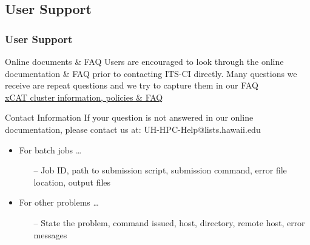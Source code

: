 \subsection{User Support}
\begin{frame}
  \frametitle{User Support}

  \begin{block}{Online documents \& FAQ}
    Users are encouraged to look through the online documentation \& FAQ prior to contacting ITS-CI directly.  Many questions we receive are repeat questions and we try to capture them in our FAQ~\\
    \href{https://www.hawaii.edu/its/ci/xcat/}{xCAT cluster information, policies \& FAQ}
  \end{block}
  \begin{block}{Contact Information}
    If your question is not answered in our online documentation, please contact us at: UH-HPC-Help@lists.hawaii.edu
    
    \begin{itemize}
    \item For batch jobs \ldots
      \begin{itemize}
      \item[--] Job ID, path to submission script, submission command, error file location, output files
      \end{itemize} 
    \item For other problems \ldots
      \begin{itemize}
      \item[--] State the problem, command issued, host, directory, remote host, error messages
      \end{itemize}
    \end{itemize}
  \end{block}
\end{frame}


